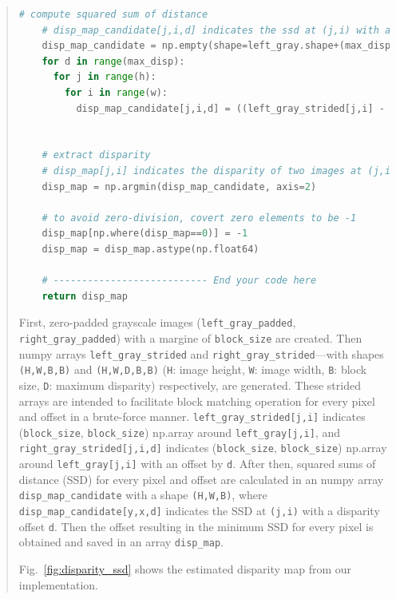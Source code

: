\documentclass[11pt]{article}
\begin{document}
\begin{quote}
\begin{lstlisting}[language=Python, basicstyle=\tiny]
    # compute squared sum of distance
    # disp_map_candidate[j,i,d] indicates the ssd at (j,i) with a disparity offset d
    disp_map_candidate = np.empty(shape=left_gray.shape+(max_disp,), dtype=np.int64)
    for d in range(max_disp):
      for j in range(h):
        for i in range(w):
          disp_map_candidate[j,i,d] = ((left_gray_strided[j,i] - right_gray_strided[j,i,d])**2).sum()
    
  
    # extract disparity
    # disp_map[j,i] indicates the disparity of two images at (j,i)
    disp_map = np.argmin(disp_map_candidate, axis=2)
    
    # to avoid zero-division, covert zero elements to be -1
    disp_map[np.where(disp_map==0)] = -1
    disp_map = disp_map.astype(np.float64)
  
    # --------------------------- End your code here
    return disp_map
\end{lstlisting}

First, zero-padded grayscale images (\texttt{left\_gray\_padded}, \texttt{right\_gray\_padded}) with a margine of \texttt{block\_size} are created. Then numpy arrays \texttt{left\_gray\_strided} and \texttt{right\_gray\_strided}---with shapes \texttt{(H,W,B,B)} and \texttt{(H,W,D,B,B)} (\texttt{H}: image height, \texttt{W}: image width, \texttt{B}: block size, \texttt{D}: maximum disparity) respectively, are generated. These strided arrays are intended to facilitate block matching operation for every pixel and offset in a brute-force manner. \texttt{left\_gray\_strided[j,i]} indicates (\texttt{block\_size}, \texttt{block\_size}) np.array around \texttt{left\_gray[j,i]}, and \texttt{right\_gray\_strided[j,i,d]} indicates (\texttt{block\_size}, \texttt{block\_size}) np.array around \texttt{left\_gray[j,i]} with an offset by \texttt{d}. After then, squared sums of distance (SSD) for every pixel and offset are calculated in an numpy array \texttt{disp\_map\_candidate} with a shape \texttt{(H,W,B)}, where \texttt{disp\_map\_candidate[y,x,d]} indicates the SSD at \texttt{(j,i)} with a disparity offset \texttt{d}. Then the offset resulting in the minimum SSD for every pixel is obtained and saved in an array \texttt{disp\_map}. 

Fig.~\ref{fig:disparity_ssd} shows the estimated disparity map from our implementation.


\end{quote}
\end{document}
